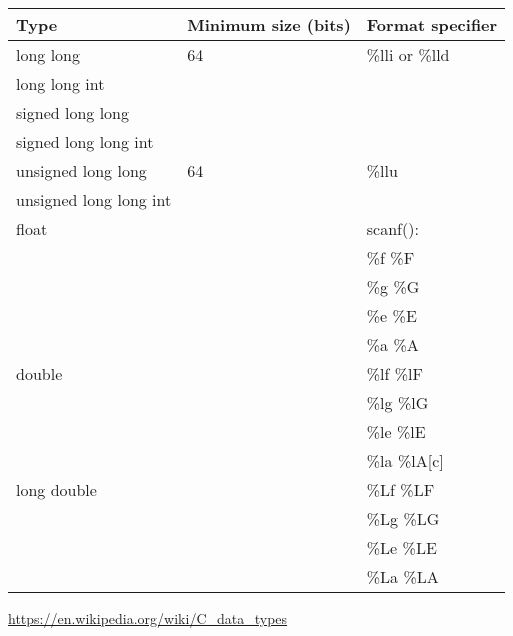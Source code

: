 \begin{frame}[fragile]
\begin{columns}
\begin{column}{0.45\textwidth}
{\tiny
\begin{tabular}{|l|l|l|} \hline
Type & Minimum size (bits) & Format specifier \\ \hline
%
long long & 64 & \%lli or \%lld \\
long long int &  &  \\
signed long long &  &  \\
signed long long int &  &  \\ \hline
%
unsigned long long & 64 & \%llu \\
unsigned long long int &  &  \\ \hline
%
float &  & scanf(): \\
 &  & \%f \%F \\
 &  & \%g \%G \\
 &  & \%e \%E \\
 &  & \%a \%A \\ \hline
%
double &  & \%lf \%lF \\
 &  & \%lg \%lG \\
 &  & \%le \%lE \\
 &  & \%la \%lA[c] \\ \hline
%
long double & & \%Lf \%LF \\
 &  & \%Lg \%LG \\
 &  & \%Le \%LE \\
 &  & \%La \%LA \\ \hline
\end{tabular}
}
{\tiny \url{https://en.wikipedia.org/wiki/C_data_types}}
\end{column}

\end{columns}
\end{frame}


